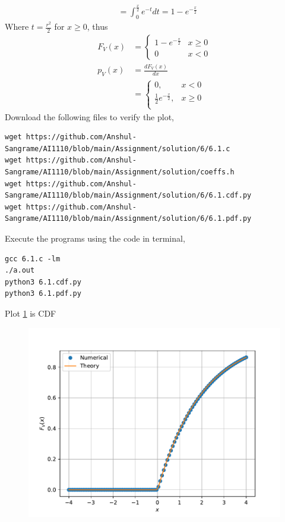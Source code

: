 \documentclass[journal,12pt,twocolumn]{IEEEtran}
\renewcommand\thesection{\arabic{section}}
\begin{document}
\begin{enumerate}[label=\thesection.\arabic*,ref=\thesection.\theenumi]
\begin{align}
			&= \int_{0}^{\frac{x}{2}}e^{-t}dt = 1 - e^{-\frac{x}{2}}
		\end{align}
Where $t = \frac{r^2}{2}$ for $x \geq 0$, thus
		\begin{align}
			F_V(x) &= 
			\begin{cases}
				1 - e^{-\frac{x}{2}} & x \geq 0 \\
				0 & x < 0 
			\end{cases} \label{eq:chi-cdf} \\
			p_V(x) & = \frac{d F_V(x)}{dx}\\
			&= \begin{cases}
				0, & x < 0 \\
				\frac{1}{2}e^{-\frac{x}{2}}, & x \geq 0 \\
			\end{cases} \label{eq:chi-pdf}
		\end{align}
Download the following files to verify the plot,
\begin{lstlisting}
wget https://github.com/Anshul-Sangrame/AI1110/blob/main/Assignment/solution/6/6.1.c
wget https://github.com/Anshul-Sangrame/AI1110/blob/main/Assignment/solution/coeffs.h
wget https://github.com/Anshul-Sangrame/AI1110/blob/main/Assignment/solution/6/6.1.cdf.py
wget https://github.com/Anshul-Sangrame/AI1110/blob/main/Assignment/solution/6/6.1.pdf.py
\end{lstlisting}
Execute the programs using the code in terminal,
\begin{lstlisting}
gcc 6.1.c -lm
./a.out
python3 6.1.cdf.py
python3 6.1.pdf.py
\end{lstlisting}
Plot \ref{fig:6.1.cdf} is CDF
\begin{figure}[!ht]
    \centering
    \includegraphics[width=\columnwidth]{../figs/chi_cdf.pdf}
    \caption{}
    \label{fig:6.1.cdf}
\end{figure}


\end{enumerate}
\end{document}
